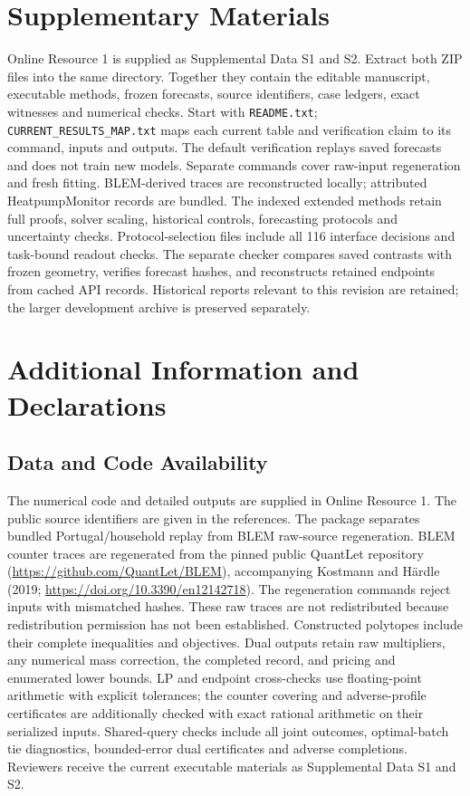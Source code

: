 \documentclass[12pt]{article}
\begin{document}
\section*{Supplementary Materials}
Online Resource 1 is supplied as Supplemental Data S1 and S2. Extract both
ZIP files into the same directory. Together they contain the editable
manuscript, executable methods, frozen forecasts, source identifiers, case
ledgers, exact witnesses and numerical checks. Start with \texttt{README.txt};
\texttt{CURRENT\_RESULTS\_MAP.txt} maps each current table and verification
claim to its command, inputs and outputs. The default verification replays
saved forecasts and does not train new models. Separate commands cover
raw-input regeneration and fresh fitting. BLEM-derived traces are reconstructed
locally; attributed HeatpumpMonitor records are bundled. The indexed extended
methods retain full proofs, solver scaling, historical controls, forecasting
protocols and uncertainty checks. Protocol-selection files include all 116
interface decisions and task-bound readout checks. The separate checker
compares saved contrasts with frozen geometry, verifies forecast hashes,
and reconstructs retained endpoints from cached API records. Historical
reports relevant to this revision are retained; the larger development
archive is preserved separately.

\section*{Additional Information and Declarations}
\subsection*{Data and Code Availability}
The numerical code and detailed outputs are supplied in Online Resource 1.
The public source identifiers are given in the references. The package
separates bundled Portugal/household replay from BLEM raw-source
regeneration. BLEM counter traces are regenerated from the pinned public
QuantLet repository (\url{https://github.com/QuantLet/BLEM}), accompanying
Kostmann and H\"ardle (2019; \url{https://doi.org/10.3390/en12142718}).
The regeneration commands reject inputs with mismatched hashes.
These raw traces are not redistributed because redistribution permission
has not been established.
Constructed polytopes include their complete inequalities and objectives.
Dual outputs retain raw multipliers, any numerical mass correction, the
completed record, and pricing and enumerated lower bounds. LP and endpoint
cross-checks use floating-point arithmetic with explicit tolerances; the
counter covering and adverse-profile certificates are additionally checked
with exact rational arithmetic on their serialized inputs. Shared-query
checks include all joint outcomes, optimal-batch tie diagnostics, bounded-error
dual certificates and adverse completions. Reviewers receive the current
executable materials as Supplemental Data S1 and S2.
\end{document}
